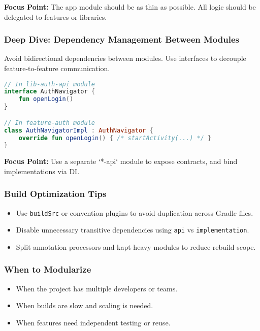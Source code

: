 \documentclass[a4paper,12pt]{article}
\begin{document}
\textbf{Focus Point:} The app module should be as thin as possible. All logic should be delegated to features or libraries.

\subsubsection{Deep Dive: Dependency Management Between Modules}

Avoid bidirectional dependencies between modules. Use interfaces to decouple feature-to-feature communication.

\begin{lstlisting}[language=Kotlin]
// In lib-auth-api module
interface AuthNavigator {
    fun openLogin()
}

// In feature-auth module
class AuthNavigatorImpl : AuthNavigator {
    override fun openLogin() { /* startActivity(...) */ }
}
\end{lstlisting}

\textbf{Focus Point:} Use a separate `*-api` module to expose contracts, and bind implementations via DI.

\subsubsection{Build Optimization Tips}

\begin{itemize}
  \item Use \texttt{buildSrc} or convention plugins to avoid duplication across Gradle files.
  \item Disable unnecessary transitive dependencies using \texttt{api} vs \texttt{implementation}.
  \item Split annotation processors and kapt-heavy modules to reduce rebuild scope.
\end{itemize}

\subsubsection{When to Modularize}

\begin{itemize}
  \item When the project has multiple developers or teams.
  \item When builds are slow and scaling is needed.
  \item When features need independent testing or reuse.
\end{itemize}
\end{document}
